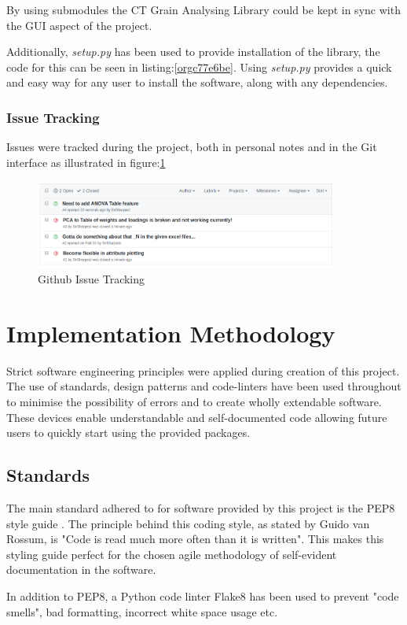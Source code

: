 \documentclass[11pt]{report}
\begin{document}
By using submodules the CT Grain Analysing Library could be kept in sync with the GUI aspect of the project.

Additionally, \emph{setup.py} has been used to provide installation of the library, the code for this can be seen in listing:\ref{orgc77e6be}. Using \emph{setup.py} provides a quick and easy way for any user to install the software, along with any dependencies.

\subsubsection{Issue Tracking}
\label{sec:orgdea18b2}
Issues were tracked during the project, both in personal notes and in the Git interface as illustrated in figure:\ref{fig:org6cd3709}
\begin{figure}[htbp]
\centering
\includegraphics[width=10cm]{./images/github.png}
\caption{\label{fig:org6cd3709}
Github Issue Tracking}
\end{figure}

\section{Implementation Methodology}
\label{sec:orgfbe6f8c}
Strict software engineering principles were applied during creation of this project. The use of standards, design patterns and code-linters have been used throughout to minimise the possibility of errors and to create wholly extendable software. These devices enable understandable and self-documented code allowing future users to quickly start using the provided packages.
\subsection{Standards}
\label{sec:org253b3f9}
The main standard adhered to for software provided by this project is the PEP8 style guide \cite{VanRossum}. The principle behind this coding style, as stated by Guido van Rossum, is "Code is read much more often than it is written". This makes this styling guide perfect for the chosen agile methodology of self-evident documentation in the software.

In addition to PEP8, a Python code linter Flake8 has been used to prevent "code smells", bad formatting, incorrect white space usage etc.
\end{document}
